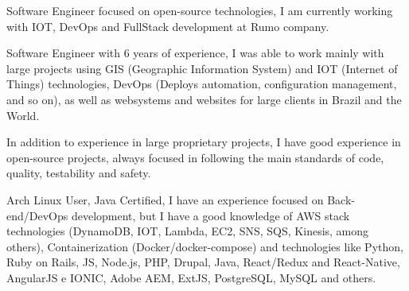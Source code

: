 

\begin{cvparagraph}

Software Engineer focused on open-source technologies, I am currently working with IOT, DevOps and FullStack development at Rumo company.

Software Engineer with 6 years of experience, I was able to work mainly with large projects using GIS (Geographic Information System) and IOT (Internet of Things) technologies, DevOps (Deploys automation, configuration management, and so on), as well as websystems and websites for large clients in Brazil and the World.

In addition to experience in large proprietary projects, I have good experience in open-source projects, always focused in following the main standards of code, quality, testability and safety.

Arch Linux User, Java Certified, I have an experience focused on Back-end/DevOps development, but I have a good knowledge of AWS stack technologies (DynamoDB, IOT, Lambda, EC2, SNS, SQS, Kinesis, among others), Containerization (Docker/docker-compose) and technologies like Python, Ruby on Rails, JS, Node.js, PHP, Drupal, Java, React/Redux and React-Native, AngularJS e IONIC, Adobe AEM, ExtJS, PostgreSQL, MySQL and others.
\end{cvparagraph}
